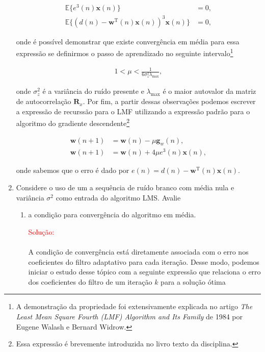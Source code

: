 \documentclass[a4paper,10pt]{article}
\begin{document}
\begin{enumerate}
				\begin{align}
					\mathbb{E}\{e^{3}(n) \mathbf{x}(n)\} &= 0, \\
					\mathbb{E}\{(d(n) - \mathbf{w}^{\text{T}}(n)\mathbf{x}(n))^{3} \mathbf{x}(n)\} &= 0, 
				\end{align}

				onde é possível demonstrar que existe convergência em média para essa expressão se definirmos o passo de aprendizado no seguinte intervalo\footnote{A demonstração da propriedade foi extensivamente explicada no artigo \textit{The Least Mean Square Fourth (LMF) Algorithm and Its Family} de 1984 por Eugene Walash e Bernard Widrow.}

				\begin{align}
					1 < \mu < \frac{1}{6 \sigma^{2}_{z} \lambda_{\text{max}}},
				\end{align}

				onde $\sigma^{2}_{z}$ é a variância do ruído presente e $\lambda_{\text{max}}$ é o maior autovalor da matriz de autocorrelação $\mathbf{R}_{x}$. Por fim, a partir dessas observações podemos escrever a expressão de recurssão para o LMF utilizando 
				a expressão padrão para o algoritmo do gradiente descendente\footnote{Essa expressão é brevemente introduzida no livro texto da disciplina.}

				\begin{align}
					\mathbf{w}(n + 1) &= \mathbf{w}(n) - \mu \mathbf{g}_{w}(n), \\
					\mathbf{w}(n + 1) &= \mathbf{w}(n) + 4 \mu e^{3}(n) \mathbf{x}(n),
				\end{align}

				onde sabemos que o erro é dado por $e(n) = d(n) - \mathbf{w}^{\text{T}}(n)\mathbf{x}(n)$.

			\item Considere o uso de um a sequência de ruído branco com média nula e variância $\sigma^{2}$ como entrada do algoritmo LMS. Avalie
				
				\begin{enumerate}
					
					\item a condição para convergência do algoritmo em média.
					
						\textcolor{red}{Solução:}
						
						\paragraph{}A condição de convergência está diretamente associada com o erro nos coeficientes do filtro adaptativo para cada iteração.
						Desse modo, podemos iniciar o estudo desse tópico com a seguinte expressão que relaciona o erro dos coeficientes do filtro de um iteração
						$k$ para a solução ótima
						

\end{enumerate}
\end{enumerate}
\end{document}
